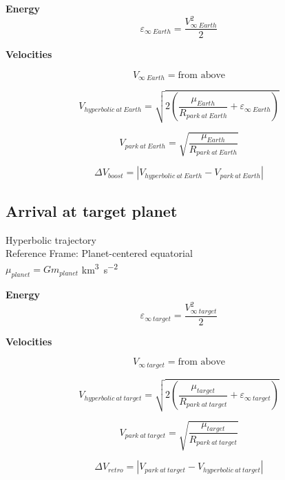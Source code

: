 \documentclass{article}
\begin{document}
\begin{multicols}{2}
	\textbf{Energy}
	\begin{equation*}
	\varepsilon_{\infty\ Earth} = \dfrac{V^2_{\infty\ Earth}}{2}
	\end{equation*}

	\vfill\null
	\columnbreak
	\textbf{Velocities}

	\begin{equation*}
	V_{\infty\ Earth} = \text{from above}
	\end{equation*}

	\begin{equation*}
	V_{hyperbolic\ at\ Earth} = \sqrt{2\left(\dfrac{\mu_{Earth}}{R_{park\ at\ Earth}} + \varepsilon_{\infty\ Earth}\right)}
	\end{equation*}

	\begin{equation*}
	V_{park\ at\ Earth} = \sqrt{\dfrac{\mu_{Earth}}{R_{park\ at\ Earth}}}
	\end{equation*}

	\begin{equation*}
	\Delta V_{boost} = |V_{hyperbolic\ at\ Earth} - V_{park\ at\ Earth}|
	\end{equation*}
\end{multicols}

\subsection{Arrival at target planet}
Hyperbolic trajectory\\
Reference Frame: Planet-centered equatorial\\
$\mu_{planet} = G m_{planet}$ \si{\kilo\meter\cubed\per\second\squared}\\

\begin{multicols}{2}
	\textbf{Energy}
	\begin{equation*}
	\varepsilon_{\infty\ target} = \dfrac{V^2_{\infty\ target}}{2}
	\end{equation*}

	\vfill\null
	\columnbreak
	\textbf{Velocities}

	\begin{equation*}
	V_{\infty\ target} = \text{from above}
	\end{equation*}

	\begin{equation*}
	V_{hyperbolic\ at\ target} = \sqrt{2\left(\dfrac{\mu_{target}}{R_{park\ at\ target}} + \varepsilon_{\infty\ target}\right)}
	\end{equation*}

	\begin{equation*}
	V_{park\ at\ target} = \sqrt{\dfrac{\mu_{target}}{R_{park\ at\ target}}}
	\end{equation*}

	\begin{equation*}
	\Delta V_{retro} = |V_{park\ at\ target} - V_{hyperbolic\ at\ target}|
	\end{equation*}
\end{multicols}
\end{document}
